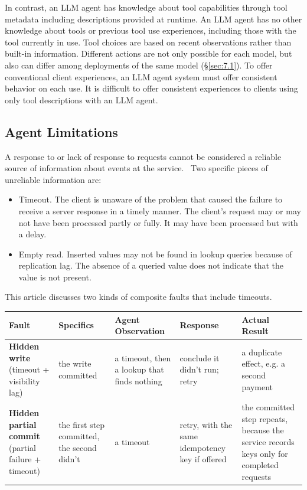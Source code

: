 \documentclass[letterpaper,twocolumn,10pt]{article}
\begin{document}
In contrast, an LLM agent has knowledge about tool capabilities through tool metadata including descriptions provided at runtime. An LLM agent has no other knowledge about tools or previous tool use experiences, including those with the tool currently in use. Tool choices are based on recent observations rather than built-in information. Different actions are not only possible for each model, but also can differ among deployments of the same model (\S\ref{sec:7.1}). To offer conventional client experiences, an LLM agent system must offer consistent behavior on each use. It is difficult to offer consistent experiences to clients using only tool descriptions with an LLM agent.

\subsection{Agent Limitations}\label{sec:2.2}

A response to or lack of response to requests cannot be considered a reliable source of information about events at the service.~\cite{lamport1978clocks} Two specific pieces of unreliable information are:

\begin{itemize}
\item Timeout. The client is unaware of the problem that caused the failure to receive a server response in a timely manner. The client's request may or may not have been processed partly or fully. It may have been processed but with a delay.
\item Empty read. Inserted values may not be found in lookup queries because of replication lag. The absence of a queried value does not indicate that the value is not present.
\end{itemize}

This article discusses two kinds of composite faults that include timeouts.

\begin{table}[t]
\centering
\footnotesize
\begin{tabularx}{\textwidth}{XXXXX}
\toprule
\textbf{Fault} & \textbf{Specifics} & \textbf{Agent Observation} & \textbf{Response} & \textbf{Actual Result} \\
\midrule
\textbf{Hidden write} (timeout + visibility lag) & the write committed & a timeout, then a lookup that finds nothing & conclude it didn't run; retry & a duplicate effect, e.g. a second payment \\
\textbf{Hidden partial commit} (partial failure + timeout) & the first step committed, the second didn't & a timeout & retry, with the same idempotency key if offered & the committed step repeats, because the service records keys only for completed requests \\
\bottomrule
\end{tabularx}

\end{table}
\end{document}
